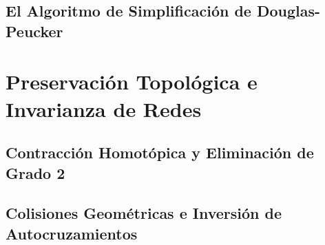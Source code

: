\subsection{El Algoritmo de Simplificación de Douglas-Peucker}
%


\section{Preservación Topológica e Invarianza de Redes}

\subsection{Contracción Homotópica y Eliminación de Grado 2}
%

\subsection{Colisiones Geométricas e Inversión de Autocruzamientos}
%



